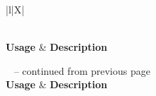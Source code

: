 \begin{xltabular}{\textwidth}{|l|X|}
	\caption[Event logs usage]
	{\textit{Event logs usage}}
	\label{tbl:ch1_eventLogsUsage} \\
    
	\hline
	\textbf{Usage} & \textbf{Description} \\
	\hline
	\endfirsthead

	{\tablename\ \thetable{} -- continued from previous page} \\
	\hline
	\textbf{Usage} & \textbf{Description} \\
	\endhead

	 \\ \hline
	\endfoot

	\hline
	\endlastfoot


\end{xltabular}
